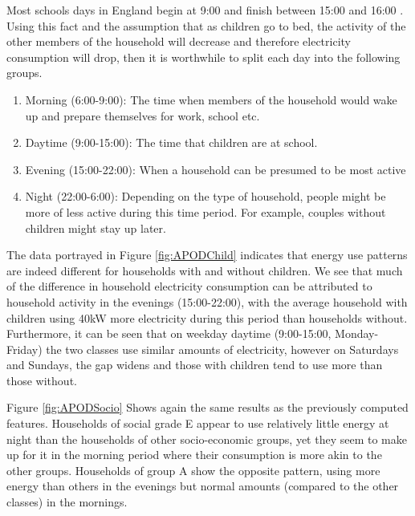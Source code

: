 Most schools days in England begin at 9:00 and finish between 15:00 and 16:00 \cite{school_times}. Using this fact and the assumption that as children go to bed, the activity of the other members of the household will decrease and therefore electricity consumption will drop, then it is worthwhile to split each day into the following groups.
\begin{enumerate}
\item Morning (6:00-9:00): The time when members of the household would wake up and prepare themselves for work, school etc.
\item Daytime (9:00-15:00): The time that children are at school.
\item Evening (15:00-22:00):  When a household can be presumed to be most active
\item Night (22:00-6:00): Depending on the type of household, people might be more of less active during this time period. For example, couples without children might stay up later.
\end{enumerate}
\APODChild


The data portrayed in Figure \ref{fig:APODChild} indicates that energy use patterns are indeed different for households with and without children. We see that much of the difference in household electricity consumption can be attributed to household activity in the evenings (15:00-22:00), with the average household with children using 40kW more electricity during this period than households without. Furthermore, it can be seen that on weekday daytime (9:00-15:00, Monday-Friday) the two classes use similar amounts of electricity, however on Saturdays and Sundays, the gap widens and those with children tend to use more than those without. 

\APODSocio

Figure \ref{fig:APODSocio} Shows again the same results as the previously computed features. Households of social grade E appear to use relatively little energy at night than the households of other socio-economic groups, yet they seem to make up for it in the morning period where their consumption is more akin to the other groups. Households of group A show the opposite pattern, using more energy than others in the evenings but normal amounts (compared to the other classes) in the mornings.


